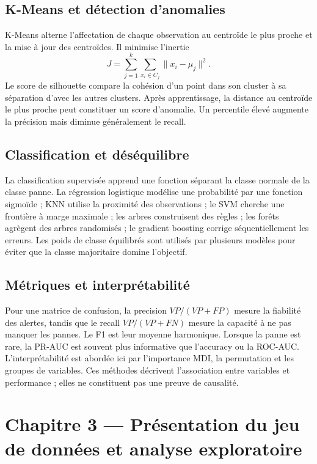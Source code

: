 \documentclass[12pt,a4paper]{article}
\begin{document}
\subsection{K-Means et détection d'anomalies}
K-Means alterne l'affectation de chaque observation au centroïde le plus proche et la mise à jour des centroïdes. Il minimise l'inertie
\[
J=\sum_{j=1}^{k}\sum_{x_i\in C_j}\lVert x_i-\mu_j\rVert^2.
\]
Le score de silhouette compare la cohésion d'un point dans son cluster à sa séparation d'avec les autres clusters. Après apprentissage, la distance au centroïde le plus proche peut constituer un score d'anomalie. Un percentile élevé augmente la précision mais diminue généralement le recall.

\subsection{Classification et déséquilibre}
La classification supervisée apprend une fonction séparant la classe normale de la classe panne. La régression logistique modélise une probabilité par une fonction sigmoïde ; KNN utilise la proximité des observations ; le SVM cherche une frontière à marge maximale ; les arbres construisent des règles ; les forêts agrègent des arbres randomisés ; le gradient boosting corrige séquentiellement les erreurs. Les poids de classe équilibrés sont utilisés par plusieurs modèles pour éviter que la classe majoritaire domine l'objectif.

\subsection{Métriques et interprétabilité}
Pour une matrice de confusion, la precision $VP/(VP+FP)$ mesure la fiabilité des alertes, tandis que le recall $VP/(VP+FN)$ mesure la capacité à ne pas manquer les pannes. Le F1 est leur moyenne harmonique. Lorsque la panne est rare, la PR-AUC est souvent plus informative que l'accuracy ou la ROC-AUC. L'interprétabilité est abordée ici par l'importance MDI, la permutation et les groupes de variables. Ces méthodes décrivent l'association entre variables et performance ; elles ne constituent pas une preuve de causalité.

\section{Chapitre 3 — Présentation du jeu de données et analyse exploratoire}\label{sec:donnees}
\end{document}
